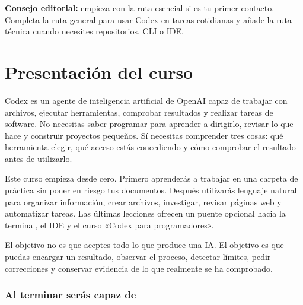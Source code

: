 \documentclass[10pt,a4paper,openany]{book}
\begin{document}
\vfill
\begin{tcolorbox}[
  enhanced,colback=Panel,colframe=Border,boxrule=0.5pt,arc=2mm,
  borderline west={2.6pt}{0pt}{BrandViolet},left=4mm,right=4mm,top=3mm,bottom=3mm
]
\small\sffamily
\textbf{Consejo editorial:} empieza con la ruta esencial si es tu primer contacto. Completa la ruta general para usar Codex en tareas cotidianas y añade la ruta técnica cuando necesites repositorios, CLI o IDE.
\end{tcolorbox}
\clearpage

\renewcommand{\contentsname}{Mapa del manual}
\tableofcontents
\clearpage
{}

\chapter{Presentación del curso}\label{presentaciuxf3n-del-curso}

Codex es un agente de inteligencia artificial de OpenAI capaz de
trabajar con archivos, ejecutar herramientas, comprobar resultados y
realizar tareas de software. No necesitas saber programar para aprender
a dirigirlo, revisar lo que hace y construir proyectos pequeños. Sí
necesitas comprender tres cosas: qué herramienta elegir, qué acceso
estás concediendo y cómo comprobar el resultado antes de utilizarlo.

Este curso empieza desde cero. Primero aprenderás a trabajar en una
carpeta de práctica sin poner en riesgo tus documentos. Después
utilizarás lenguaje natural para organizar información, crear archivos,
investigar, revisar páginas web y automatizar tareas. Las últimas
lecciones ofrecen un puente opcional hacia la terminal, el IDE y el
curso «Codex para programadores».

El objetivo no es que aceptes todo lo que produce una IA. El objetivo es
que puedas encargar un resultado, observar el proceso, detectar límites,
pedir correcciones y conservar evidencia de lo que realmente se ha
comprobado.

\subsection{Al terminar serás capaz
de}\label{al-terminar-seruxe1s-capaz-de}
\end{document}

